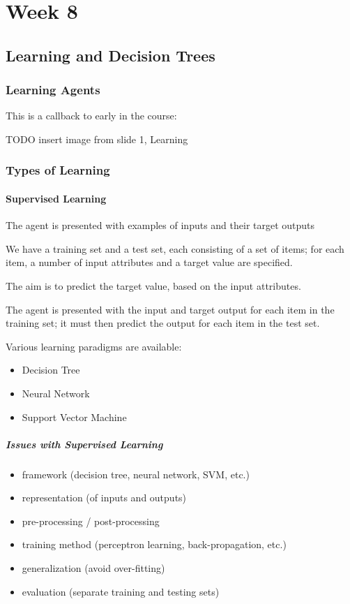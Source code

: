 \part{Week 8}
\chapter{Learning and Decision Trees}
\section{Learning Agents}
This is a callback to early in the course:

TODO insert image from slide 1, Learning

\section{Types of Learning}
\subsection{Supervised Learning}
The agent is presented with examples of inputs and their target outputs

We have a training set and a test set, each consisting of a set of items; for
each item, a number of input attributes and a target value are specified.

The aim is to predict the target value, based on the input attributes.

The agent is presented with the input and target output for each item in the
training set; it must then predict the output for each item in the test set.

Various learning paradigms are available:
\begin{itemize}
    \item Decision Tree
    \item Neural Network
    \item Support Vector Machine
\end{itemize}

\subsubsection{Issues with Supervised Learning}
\begin{itemize}
    \item framework (decision tree, neural network, SVM, etc.)
    \item representation (of inputs and outputs)
    \item pre-processing / post-processing
    \item training method (perceptron learning, back-propagation, etc.)
    \item generalization (avoid over-fitting)
    \item evaluation (separate training and testing sets)
\end{itemize}

